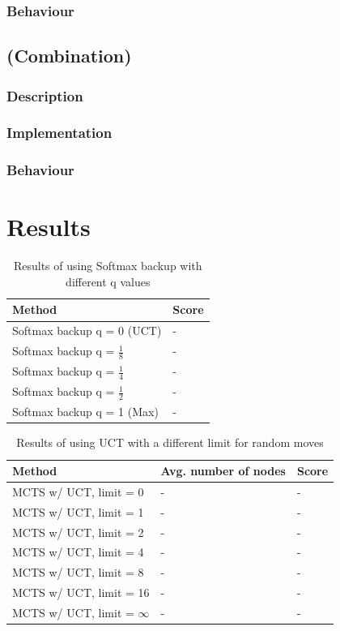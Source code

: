 \documentclass[10pt,a4paper]{article}
\begin{document}
\subsubsection{Behaviour}
\subsection{(Combination)}
\subsubsection{Description}
\subsubsection{Implementation}
\subsubsection{Behaviour}

\clearpage

\section{Results}
\renewcommand{\arraystretch}{1.5}
\begin{table}[h]
	\centering
	\begin{tabular}{| l | l |}
		\hline
		\textbf{Method} & \textbf{Score} 		\\ \hline
		Softmax backup q = 0 (UCT) 			& - \\ \hline
		Softmax backup q = $\frac{1}{8}$	& - \\ \hline
		Softmax backup q = $\frac{1}{4}$	& - \\ \hline
		Softmax backup q = $\frac{1}{2}$	& - \\ \hline
		Softmax backup q = 1 (Max)			& - \\ \hline
	\end{tabular}
	\caption{Results of using Softmax backup with different q values}
	\label{tab:softmax_results}
\end{table}

\begin{table}[h]
	\centering
	\begin{tabular}{| l | l | l |}
		\hline
		\textbf{Method} & \textbf{Avg. number of nodes} & \textbf{Score} \\ \hline
		MCTS w/ UCT, limit = 0			& - & - \\ \hline
		MCTS w/ UCT, limit = 1			& - & - \\ \hline
		MCTS w/ UCT, limit = 2			& - & - \\ \hline
		MCTS w/ UCT, limit = 4			& - & - \\ \hline
		MCTS w/ UCT, limit = 8			& - & - \\ \hline
		MCTS w/ UCT, limit = 16			& - & - \\ \hline
		MCTS w/ UCT, limit = $\infty$	& - & - \\ \hline
	\end{tabular}
	\caption{Results of using UCT with a different limit for random moves}
	\label{tab:uct_results}
\end{table}
\end{document}
